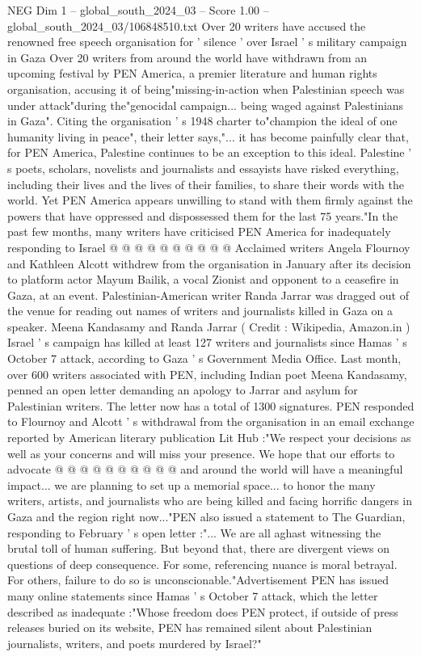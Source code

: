 \begin{textsample}{NEG Dim 1 – global\_south\_2024\_03 – Score 1.00 – global\_south\_2024\_03/106848510.txt}  \label{ex:f1_neg_431}
Over 20 writers have accused the renowned free speech organisation for ' silence ' over Israel ' s military campaign in Gaza Over 20 writers from around the world have withdrawn from an upcoming festival by PEN America, a premier literature and human rights organisation, accusing it of being"missing-in-action when Palestinian speech was under attack"during the"genocidal campaign... being waged against Palestinians in Gaza".
Citing the organisation ' s 1948 charter to"champion the ideal of one humanity living in peace", their letter says,"... it has become painfully clear that, for PEN America, Palestine continues to be an exception to this ideal.
Palestine ' s poets, scholars, novelists and journalists and essayists have risked everything, including their lives and the lives of their families, to share their words with the world.
Yet PEN America appears unwilling to stand with them firmly against the powers that have oppressed and dispossessed them for the last 75 years."In the past few months, many writers have criticised PEN America for inadequately responding to Israel @ @ @ @ @ @ @ @ @ @ Acclaimed writers Angela Flournoy and Kathleen Alcott withdrew from the organisation in January after its decision to platform actor Mayum Bailik, a vocal Zionist and opponent to a ceasefire in Gaza, at an event.
Palestinian-American writer Randa Jarrar was dragged out of the venue for reading out names of writers and journalists killed in Gaza on a speaker.
Meena Kandasamy and Randa Jarrar ( Credit : Wikipedia, Amazon.in ) Israel ' s campaign has killed at least 127 writers and journalists since Hamas ' s October 7 attack, according to Gaza ' s Government Media Office.
Last month, over 600 writers associated with PEN, including Indian poet Meena Kandasamy, penned an open letter demanding an apology to Jarrar and asylum for Palestinian writers.
The letter now has a total of 1300 signatures.
PEN responded to Flournoy and Alcott ' s withdrawal from the organisation in an email exchange reported by American literary publication Lit Hub :"We respect your decisions as well as your concerns and will miss your presence.
We hope that our efforts to advocate @ @ @ @ @ @ @ @ @ @ and around the world will have a meaningful impact... we are planning to set up a memorial space... to honor the many writers, artists, and journalists who are being killed and facing horrific dangers in Gaza and the region right now..."PEN also issued a statement to The Guardian, responding to February ' s open letter :"...
We are all aghast witnessing the brutal toll of human suffering.
But beyond that, there are divergent views on questions of deep consequence.
For some, referencing nuance is moral betrayal.
For others, failure to do so is unconscionable."Advertisement PEN has issued many online statements since Hamas ' s October 7 attack, which the letter described as inadequate :"Whose freedom does PEN protect, if outside of press releases buried on its website, PEN has remained silent about Palestinian journalists, writers, and poets murdered by Israel?"

\end{textsample}
